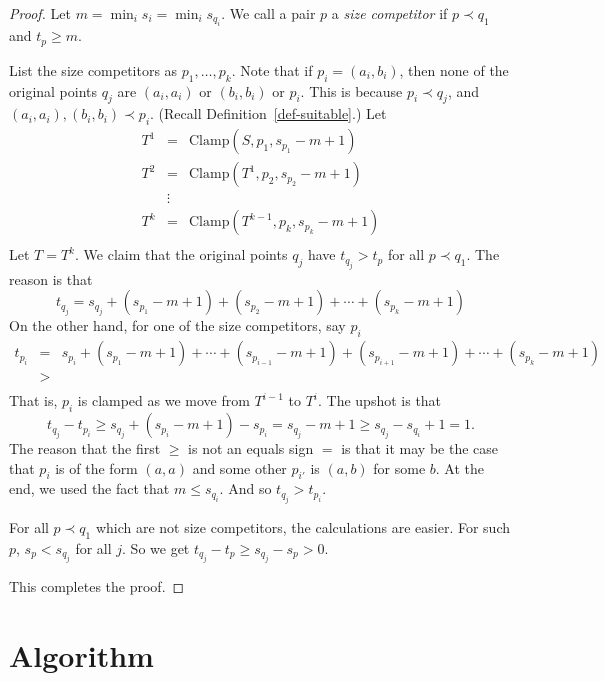 \documentclass[12pt]{article}
\theoremstyle{definition}
\newcommand{\Clamp}{\mbox{Clamp}}
\begin{document}
 \begin{proof}
 Let $m =  \min_i s_{i} = \min_i s_{q_i}$.
We call a pair $p$ a \emph{size competitor} if 
$p\prec q_1$ and $t_p \geq m$.
 
List the size competitors as $p_1, \ldots, p_k$. 
 Note that if $p_i = (a_i,b_i)$, then none of the original
 points $q_j$ are $(a_i,a_i)$ or $(b_i,b_i)$
or $p_i$.   This
is because $p_i \prec q_j$, and 
$(a_i,a_i), (b_i,b_i) \prec p_i$.
(Recall Definition~\ref{def-suitable}.)
 Let \[ \begin{array}{lcl}
 T^1  & = &  \Clamp(S,p_1,  s_{p_1} -m + 1)\\

T^2 & = & \Clamp(T^1,p_2,  s_{p_2}-m + 1 )\\
  & \vdots   & \\
T^{k} & = & \Clamp(T^{k-1},p_k, s_{p_k}-m + 1 )\\
\end{array}
\]
Let $T = T^{k}$.
We claim that the original points $q_j$ have $t_{q_j} > t_{p}$
for all $p \prec q_1$.
The reason is that 
\[ t_{q_j} = s_{q_j} + ( s_{p_1} -m + 1) + (s_{p_2}-m + 1) + \cdots 
+ ( s_{p_k} -m + 1)
\]
On the other hand, for one of the size competitors, say $p_i$
\[\begin{array}{lcl}
t_{p_i} & = & s_{p_i} + ( s_{p_1}-m  + 1) + \cdots +
(s_{p_{i-1}} -m  + 1)
+ (s_{p_{i+1}} -m  + 1) + \cdots +(s_{p_k}-m + 1)\\
& > &  \\
\end{array}
\]
That is, $p_i$ is clamped as we move from $T^{i-1}$ to $T^i$.
The upshot is that \[t_{q_j} - t_{p_i} \geq s_{q_j} + (s_{p_i}-m + 1)  -
s_{p_i} = s_{q_j} - m + 1
\geq  s_{q_j} -s_{q_i} +1  = 1.\]
The reason that the first $\geq$ is not an equals sign $=$
is that it may be the case that $p_i$ is of the form $(a,a)$
and some other $p_{i'}$ is $(a,b)$ for some $b$.
At the end, we used the fact that $m \leq s_{q_i}$.
And so $t_{q_j} > t_{p_i}$.


For all $p \prec q_1$ which are not  size competitors,
the calculations are easier.  For such $p$,
$s_p < s_{q_j}$ for all $j$.
So we get 
$t_{q_j} - t_{p} \geq s_{q_j} - s_{p} > 0$.

This completes the proof.
\end{proof}

\section{Algorithm}
\end{document}
